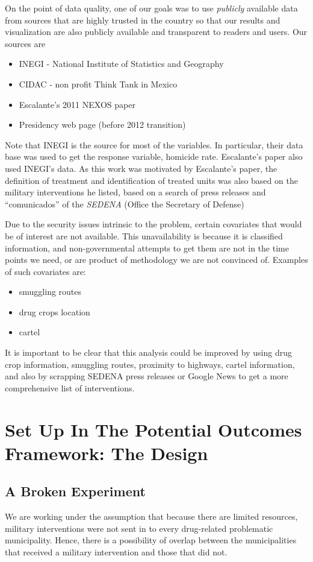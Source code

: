 \documentclass{article}[11 pt]
\begin{document}
On the point of data quality, one of our goals was to use \emph{publicly} available data from sources that are highly trusted in the country so that our results and visualization are also publicly available and transparent to readers and users.
Our sources are
		\begin{itemize}
			\item INEGI - National Institute of Statistics and Geography
			\item CIDAC -  non profit Think Tank in Mexico
			\item Escalante's 2011 NEXOS paper 
			\item Presidency web page (before 2012 transition)
		\end{itemize}
		Note that INEGI is the source for most of the variables. In particular, their data base was used to get the response variable, homicide rate. Escalante's paper also used INEGI's data. As this work was motivated by Escalante's paper, the definition of treatment and identification of treated units was also based on the military interventions he listed, based on a search of press releases and ``comunicados'' of the \emph{SEDENA} (Office the Secretary of Defense)
		
Due to the security issues intrinsic to the problem, certain covariates that would be of interest are not available. This unavailability is because it is classified information, and non-governmental attempts to get them are not in the time points we need, or are product of methodology we are not convinced of. Examples of such covariates are:
	\begin{itemize}
		\item smuggling routes
		\item drug crops location
		\item cartel
	\end{itemize}
	It is important to be clear that this analysis could be improved by using drug crop information, smuggling routes, proximity to highways, cartel information, and also by scrapping SEDENA press releases or Google News to get a more comprehensive list of interventions.

\section{Set Up In The Potential Outcomes Framework: The Design}
\subsection{A Broken Experiment}We are working under the assumption that because there are limited resources, military interventions were not sent in to every drug-related problematic municipality. Hence, there is a possibility of overlap between the municipalities that received a military intervention and those that did not.
\end{document}
